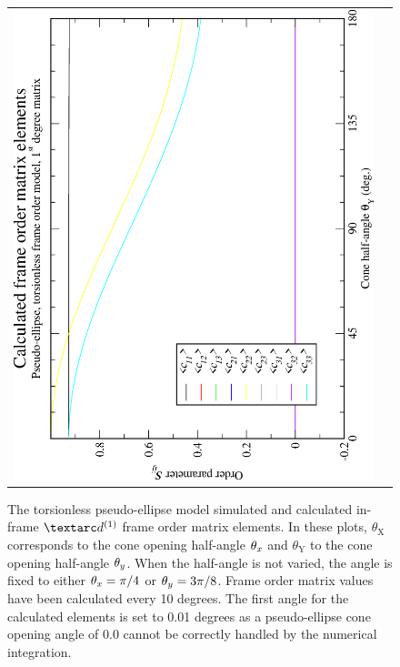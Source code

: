 \begin{figure}
\begin{tabular}{@{}cc@{}}
    \includegraphics[width=.35\textwidth,angle=270]{images/frame_order_matrix/Sij_pseudo-ellipse_torsionless_in_frame_theta_y_calc.eps} \\
  \end{tabular}
  \caption[Torsionless pseudo-ellipse simulated and calculated in-frame Daeg$^{(1)}$ elements.]{
    The torsionless pseudo-ellipse model simulated and calculated in-frame $\FOone$ frame order matrix elements.
    In these plots, $\theta_\textrm{X}$ corresponds to the cone opening half-angle $\theta_x$ and $\theta_\textrm{Y}$ to the cone opening half-angle $\theta_y$.
    When the half-angle is not varied, the angle is fixed to either $\theta_x = \pi/4$ or $\theta_y = 3\pi/8$.
    Frame order matrix values have been calculated every 10 degrees.
    The first angle for the calculated elements is set to 0.01 degrees as a pseudo-ellipse cone opening angle of 0.0 cannot be correctly handled by the numerical integration.
  }
  \label{fig: simulated and calculated in-frame 1st degree pseudo-ellipse, torsionless frame order}
\end{figure}

